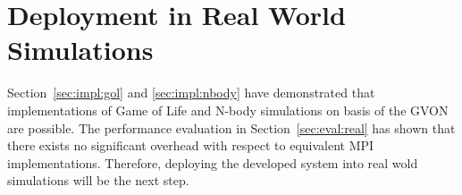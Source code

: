 




\section{Deployment in Real World Simulations}

Section~\ref{sec:impl:gol} and \ref{sec:impl:nbody} have demonstrated that
implementations of Game of Life and N-body simulations on basis of the
GVON are possible. The performance evaluation in
Section~\ref{sec:eval:real} has shown that there exists no significant overhead with
respect to equivalent MPI implementations. Therefore, deploying the
developed system into real wold simulations will be the next step.

